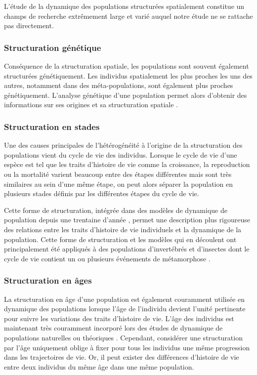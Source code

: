 L'étude de la dynamique des populations structurées spatialement constitue un
champs de recherche extrêmement large et varié auquel notre étude ne se rattache
pas directement. 

\subsubsection{Structuration génétique}

Conséquence de la structuration spatiale, les populations sont souvent également
structurées génétiquement. Les individus spatialement les plus proches les uns
des autres, notamment dans des méta-populations, sont également plus proches
génétiquement. L'analyse génétique d'une population permet alors d'obtenir des
informations sur ses origines et sa structuration spatiale
\autocites{repaci2006a,booth2009a,jorde2007a}.

\subsubsection{Structuration en stades}

Une des causes principales de l'hétérogénéité à l'origine de la
structuration des populations vient du cycle de vie des individus. Lorsque le
cycle de vie d'une espèce est tel que les traits d'histoire de vie comme la
croissance, la reproduction ou la mortalité varient beaucoup entre des étapes
différentes mais sont très similaires au sein d'une même étape, on peut alors
séparer la population en plusieurs stades définis par les différentes étapes du
cycle de vie.

Cette forme de structuration, intégrée dans des modèles de dynamique de
population depuis une trentaine d'année \autocites{gurney1983a,nisbet1983a},
permet une description plus rigoureuse des relations entre les traits
d'histoire de vie individuels et la dynamique de la population. Cette forme de
structuration et les modèles qui en découlent ont principalement été appliqués à
des populations d'invertébrés et d'insectes dont le cycle de vie contient un ou
plusieurs événements de métamorphose
\autocites{gurney1980a,gurney1983a,nisbet1983a,nisbet1989a,mccauley1996a}.

\subsubsection{Structuration en âges}

La structuration en âge d'une population est également couramment utilisée en
dynamique des populations lorsque l'âge de l'individu devient l'unité pertinente
pour suivre les variations des traits d'histoire de vie. L'âge des individus est
maintenant très couramment incorporé lors des études de dynamique de populations
naturelles ou théoriques
\autocite[par
ex. ][]{coulson2008a,marteinsdottir2002a,worden2010a,robinson2013a}. 
Cependant, considérer une structuration par l'âge uniquement oblige à fixer pour
tous les individus une même progression dans les trajectoires de vie. Or, il
peut exister des différences d'histoire de vie entre deux individus du même âge
dans une même population. 

